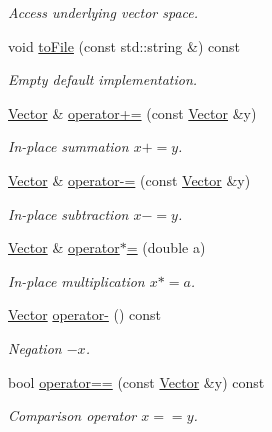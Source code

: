\begin{DoxyCompactItemize}
\begin{DoxyCompactList}\small\item\em Access underlying vector space. \end{DoxyCompactList}\item 
\hypertarget{classSpacy_1_1VectorBase_a244a3e85ec49dbf2741ca46ea4b711c9}{}void \hyperlink{classSpacy_1_1VectorBase_a244a3e85ec49dbf2741ca46ea4b711c9}{to\+File} (const std\+::string \&) const \label{classSpacy_1_1VectorBase_a244a3e85ec49dbf2741ca46ea4b711c9}

\begin{DoxyCompactList}\small\item\em Empty default implementation. \end{DoxyCompactList}\item 
\hyperlink{classSpacy_1_1FEniCS_1_1Vector}{Vector} \& \hyperlink{classSpacy_1_1AddArithmeticOperators_afad1d01e1e8c6f75290ac46d9b047ea8}{operator+=} (const \hyperlink{classSpacy_1_1FEniCS_1_1Vector}{Vector} \&y)
\begin{DoxyCompactList}\small\item\em In-\/place summation $ x+=y$. \end{DoxyCompactList}\item 
\hyperlink{classSpacy_1_1FEniCS_1_1Vector}{Vector} \& \hyperlink{classSpacy_1_1AddArithmeticOperators_a9fa91e177d13203cfe8cfa991c64ca36}{operator-\/=} (const \hyperlink{classSpacy_1_1FEniCS_1_1Vector}{Vector} \&y)
\begin{DoxyCompactList}\small\item\em In-\/place subtraction $ x-=y$. \end{DoxyCompactList}\item 
\hyperlink{classSpacy_1_1FEniCS_1_1Vector}{Vector} \& \hyperlink{classSpacy_1_1AddArithmeticOperators_a1d3db95b24fd2bc1de712c9e04c47e2f}{operator$\ast$=} (double a)
\begin{DoxyCompactList}\small\item\em In-\/place multiplication $ x*=a$. \end{DoxyCompactList}\item 
\hyperlink{classSpacy_1_1FEniCS_1_1Vector}{Vector} \hyperlink{classSpacy_1_1AddArithmeticOperators_a5acd030bf265d130983fd6e3c5b68be5}{operator-\/} () const
\begin{DoxyCompactList}\small\item\em Negation $ -x$. \end{DoxyCompactList}\item 
bool \hyperlink{classSpacy_1_1AddArithmeticOperators_a5ff1909f49f4a705d69663dc2d4b6316}{operator==} (const \hyperlink{classSpacy_1_1FEniCS_1_1Vector}{Vector} \&y) const
\begin{DoxyCompactList}\small\item\em Comparison operator $ x==y$. \end{DoxyCompactList}\end{DoxyCompactItemize}


